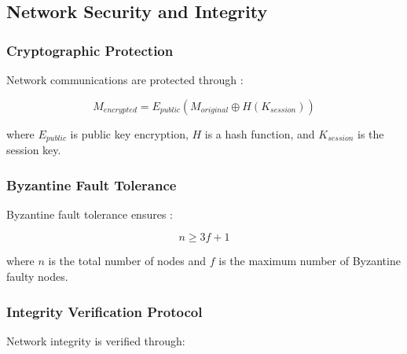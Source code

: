 \subsection{Network Security and Integrity}

\subsubsection{Cryptographic Protection}

Network communications are protected through \cite{menezes1996handbook}:

\begin{equation}
M_{encrypted} = E_{public}(M_{original} \oplus H(K_{session}))
\end{equation}

where $E_{public}$ is public key encryption, $H$ is a hash function, and $K_{session}$ is the session key.

\subsubsection{Byzantine Fault Tolerance}

Byzantine fault tolerance ensures \cite{castro1999practical}:

\begin{equation}
n \geq 3f + 1
\end{equation}

where $n$ is the total number of nodes and $f$ is the maximum number of Byzantine faulty nodes.

\subsubsection{Integrity Verification Protocol}

Network integrity is verified through:


